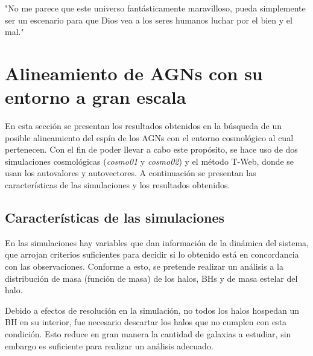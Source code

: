 \begin{savequote}[60mm]
"No me parece que este universo fantásticamente maravilloso, pueda simplemente ser un escenario para que Dios vea a los seres humanos luchar por el bien y el mal."
\end{savequote}




\chapter{Alineamiento de AGNs con su entorno a gran escala}
\label{cha:cosmic_web}

En esta sección se presentan los resultados obtenidos en la búsqueda de un posible alineamiento del espín de los AGNs con el entorno cosmológico al cual pertenecen. Con el fin de poder llevar a cabo este propósito, se hace uso de dos simulaciones cosmológicas ({\it{cosmo01}} y {\it{cosmo02}}) y el método T-Web, donde se usan los autovalores y autovectores. A continuación se presentan las características de las simulaciones y  los resultados obtenidos.

\section{Características de las simulaciones}
\label{sec: propiedades en las simulaciones}

En las simulaciones hay variables que dan información de la dinámica del sistema, que arrojan criterios suficientes para decidir si lo obtenido está en concordancia con las observaciones. Conforme a esto, se pretende realizar un análisis a la distribución de masa (función de masa) de los halos, BHs y de masa estelar del halo. 

Debido a efectos de resolución en la simulación, no todos los halos hospedan un BH en su interior, fue necesario descartar los halos que no cumplen con esta condición. Esto reduce en gran manera la cantidad de galaxias a estudiar, sin embargo es suficiente para realizar un análisis adecuado.

